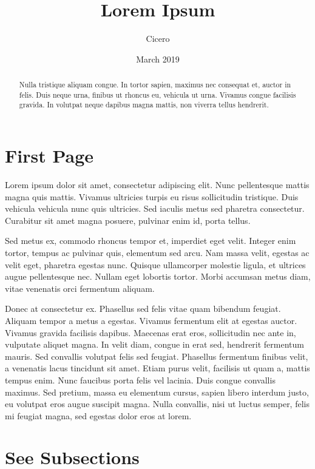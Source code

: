 \documentclass{article}
\title{Lorem Ipsum}
\author{Cicero}
\date{March 2019}
\begin{document}
\maketitle
\newpage
\tableofcontents
\newpage
\begin{abstract}
	Nulla tristique aliquam congue. 
	In tortor sapien, maximus nec consequat et, auctor in felis. 
	Duis neque urna, finibus ut rhoncus eu, vehicula ut urna. 
	Vivamus congue facilisis gravida. 
	In volutpat neque dapibus magna mattis, non viverra tellus hendrerit. 
\end{abstract}

\section{First Page}

Lorem ipsum dolor sit amet, consectetur adipiscing elit. 
Nunc pellentesque mattis magna quis mattis. 
Vivamus ultricies turpis eu risus sollicitudin tristique. 
Duis vehicula vehicula nunc quis ultricies. 
Sed iaculis metus sed pharetra consectetur. 
Curabitur sit amet magna posuere, pulvinar enim id, porta tellus. 


Sed metus ex, commodo rhoncus tempor et, imperdiet eget velit. 
Integer enim tortor, tempus ac pulvinar quis, elementum sed arcu. 
Nam massa velit, egestas ac velit eget, pharetra egestas nunc. 
Quisque ullamcorper molestie ligula, et ultrices augue pellentesque nec. 
Nullam eget lobortis tortor. 
Morbi accumsan metus diam, vitae venenatis orci fermentum aliquam.


Donec at consectetur ex. 
Phasellus sed felis vitae quam bibendum feugiat. 
Aliquam tempor a metus a egestas. 
Vivamus fermentum elit at egestas auctor. 
Vivamus gravida facilisis dapibus. 
Maecenas erat eros, sollicitudin nec ante in, vulputate aliquet magna. 
In velit diam, congue in erat sed, hendrerit fermentum mauris. 
Sed convallis volutpat felis sed feugiat. 
Phasellus fermentum finibus velit, a venenatis lacus tincidunt sit amet. 
Etiam purus velit, facilisis ut quam a, mattis tempus enim. 
Nunc faucibus porta felis vel lacinia. 
Duis congue convallis maximus. 
Sed pretium, massa eu elementum cursus, sapien libero interdum justo, eu volutpat eros augue suscipit magna. 
Nulla convallis, nisi ut luctus semper, felis mi feugiat magna, sed egestas dolor eros at lorem.
\newpage
\section{See Subsections}
\end{document}
